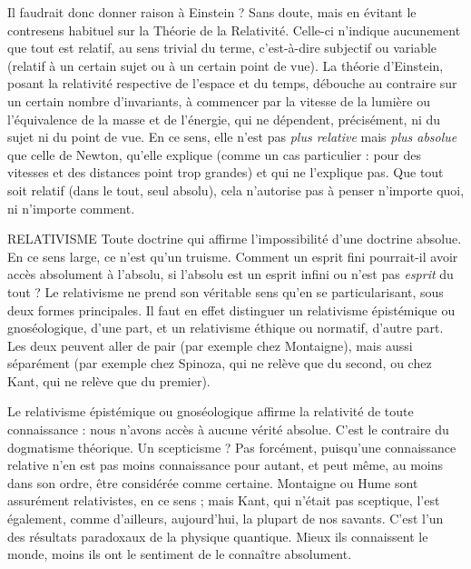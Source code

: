 Il faudrait donc donner raison à Einstein ? Sans doute, mais en évitant le
contresens habituel sur la Théorie de la Relativité. Celle-ci n’indique aucunement
que tout est relatif, au sens trivial du terme, c’est-à-dire subjectif ou
variable (relatif à un certain sujet ou à un certain point de vue). La théorie
d’Einstein, posant la relativité respective de l’espace et du temps, débouche au
contraire sur un certain nombre d’invariants, à commencer par la vitesse de la
lumière ou l’équivalence de la masse et de l'énergie, qui ne dépendent, précisément,
ni du sujet ni du point de vue. En ce sens, elle n’est pas {\it plus relative} mais
{\it plus absolue} que celle de Newton, qu’elle explique (comme un cas particulier :
pour des vitesses et des distances point trop grandes) et qui ne l'explique pas.
Que tout soit relatif (dans le tout, seul absolu), cela n'autorise pas à penser
n'importe quoi, ni n'importe comment.

RELATIVISME Toute doctrine qui affirme l'impossibilité d’une doctrine
absolue. En ce sens large, ce n’est qu’un truisme. Comment
un esprit fini pourrait-il avoir accès absolument à l’absolu, si l'absolu est un
esprit infini ou n’est pas {\it esprit} du tout ? Le relativisme ne prend son véritable
sens qu’en se particularisant, sous deux formes principales. Il faut en effet distinguer
un relativisme épistémique ou gnoséologique, d’une part, et un relativisme
éthique ou normatif, d’autre part. Les deux peuvent aller de pair (par
exemple chez Montaigne), mais aussi séparément (par exemple chez Spinoza,
qui ne relève que du second, ou chez Kant, qui ne relève que du premier).

Le relativisme épistémique ou gnoséologique affirme la relativité de toute
connaissance : nous n’avons accès à aucune vérité absolue. C’est le contraire du
dogmatisme théorique. Un scepticisme ? Pas forcément, puisqu’une connaissance
relative n’en est pas moins connaissance pour autant, et peut même, au
moins dans son ordre, être considérée comme certaine. Montaigne ou Hume
sont assurément relativistes, en ce sens ; mais Kant, qui n'était pas sceptique,
l’est également, comme d’ailleurs, aujourd’hui, la plupart de nos savants. C’est
l’un des résultats paradoxaux de la physique quantique. Mieux ils connaissent
le monde, moins ils ont le sentiment de le connaître absolument.

